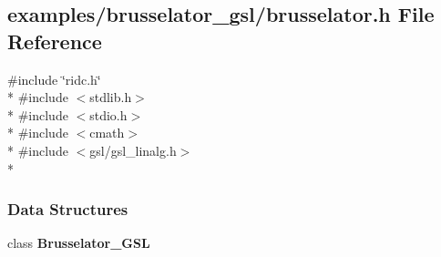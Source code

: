 \subsection{examples/brusselator\+\_\+gsl/brusselator.h File Reference}
\label{brusselator__gsl_2brusselator_8h}
{\ttfamily \#include \char`\"{}ridc.\+h\char`\"{}}\\*
{\ttfamily \#include $<$stdlib.\+h$>$}\\*
{\ttfamily \#include $<$stdio.\+h$>$}\\*
{\ttfamily \#include $<$cmath$>$}\\*
{\ttfamily \#include $<$gsl/gsl\+\_\+linalg.\+h$>$}\\*
\subsubsection*{Data Structures}
\begin{DoxyCompactItemize}
\item 
class {\bf Brusselator\+\_\+\+G\+S\+L}
\end{DoxyCompactItemize}
